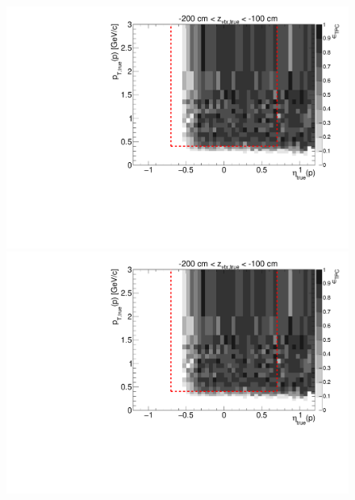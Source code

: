 \begin{figure}[hb]
{  \includegraphics[width=\linewidth,page=16]{graphics/eff/Eff2D_TPC_proton_Plus.pdf}\\
  \includegraphics[width=\linewidth,page=18]{graphics/eff/Eff2D_TPC_proton_Plus.pdf}
}%
\end{figure}
